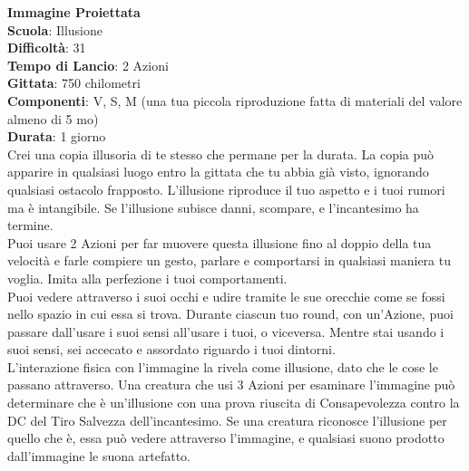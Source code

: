 \begin{multicols}{2}
\medskip\textbf{Immagine Proiettata}\\
\textbf{Scuola}: Illusione\\
\textbf{Difficoltà}: 31\\
\textbf{Tempo di Lancio}: 2 Azioni\\
\textbf{Gittata}: 750 chilometri\\
\textbf{Componenti}: V, S, M (una tua piccola riproduzione fatta di materiali del valore almeno di 5 mo)\\
\textbf{Durata}: 1 giorno\\
Crei una copia illusoria di te stesso che permane per la durata. La copia può apparire in qualsiasi luogo entro la gittata che tu abbia già visto, ignorando qualsiasi ostacolo frapposto. L'illusione riproduce il tuo aspetto e i tuoi rumori ma è intangibile. Se l'illusione subisce danni, scompare, e l'incantesimo ha termine.\\
Puoi usare 2 Azioni per far muovere questa illusione fino al doppio della tua velocità e farle compiere un gesto, parlare e comportarsi in qualsiasi maniera tu voglia. Imita alla perfezione i tuoi comportamenti.\\
Puoi vedere attraverso i suoi occhi e udire tramite le sue orecchie come se fossi nello spazio in cui essa si trova. Durante ciascun tuo round, con un'Azione, puoi passare dall'usare i suoi sensi all'usare i tuoi, o viceversa. Mentre stai usando i suoi sensi, sei accecato e assordato riguardo i tuoi dintorni.\\
L'interazione fisica con l'immagine la rivela come illusione, dato che le cose le passano attraverso. Una creatura che usi 3 Azioni per esaminare l'immagine può determinare che è un'illusione con una prova riuscita di Consapevolezza contro la DC del Tiro Salvezza dell'incantesimo. Se una creatura riconosce l'illusione per quello che è, essa può vedere attraverso l'immagine, e qualsiasi suono prodotto dall'immagine le suona artefatto.


\end{multicols}
